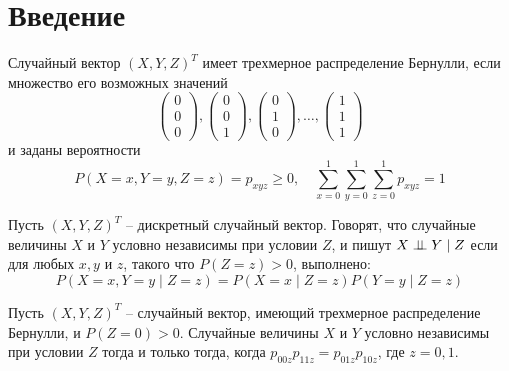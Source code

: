 \section{Введение}

\begin{definition}
    Случайный вектор $(X,Y,Z)^T$ имеет трехмерное распределение Бернулли,
    если множество его возможных значений
    $$
        \begin{pmatrix}
            0 \\
            0 \\
            0
        \end{pmatrix},
        \begin{pmatrix}
            0 \\
            0 \\
            1
        \end{pmatrix},
        \begin{pmatrix}
            0 \\
            1 \\
            0
        \end{pmatrix}, \ldots, \begin{pmatrix}
            1 \\
            1 \\
            1
        \end{pmatrix}
    $$ и заданы вероятности
    $$P(X=x,Y=y,Z=z)=p_{xyz} \geq 0, \quad \sum_{x=0}^{1}\sum_{y=0}^{1}\sum_{z=0}^{1}p_{xyz}=1$$
\end{definition}

\begin{definition}
    Пусть $(X,Y,Z)^T$ -- дискретный случайный вектор.
    Говорят, что случайные величины $X$ и $Y$ условно независимы при условии $Z$,
    и пишут $X \perp\!\!\!\perp Y \mid Z$ если
    для любых $x,y$ и $z$, такого что $P(Z=z)>0$, выполнено:
    $$
        P(X=x, Y=y \mid Z = z) = P(X=x \mid Z = z) P(Y=y \mid Z = z)
    $$
\end{definition}

\begin{theorem}\label{thm1}
    Пусть $(X,Y,Z)^T$ -- случайный вектор, имеющий трехмерное распределение Бернулли, и $P(Z=0)>0$.
    Случайные величины $X$ и $Y$ условно независимы при условии $Z$ тогда и только тогда, когда
    $p_{00z}p_{11z}=p_{01z}p_{10z}$, где $z=0,1$.
\end{theorem}

